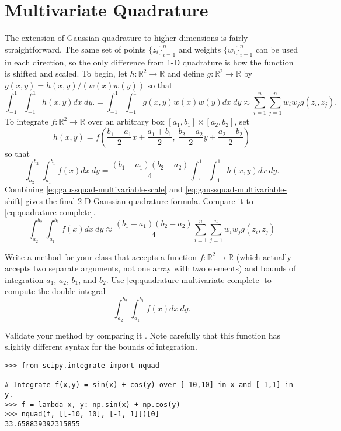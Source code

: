 \section*{Multivariate Quadrature} %

The extension of Gaussian quadrature to higher dimensions is fairly straightforward.
The same set of points $\{z_i\}_{i=1}^n$ and weights $\{w_i\}_{i=1}^n$ can be used in each direction, so the only difference from 1-D quadrature is how the function is shifted and scaled.
To begin, let $h:\mathbb{R}^2\rightarrow\mathbb{R}$ and define $g:\mathbb{R}^2\rightarrow\mathbb{R}$ by $g(x,y) = h(x,y)/(w(x)w(y))$ so that
\begin{equation}
\int_{-1}^1\int_{-1}^1 h(x,y)dx\:dy.
= \int_{-1}^1\int_{-1}^1 g(x,y)w(x)w(y)dx\:dy
\approx \sum_{i=1}^n \sum_{j=1}^n w_i w_j g(z_i,z_j).
\label{eq:gaussquad-multivariable-scale}
\end{equation}
To integrate $f:\mathbb{R}^2\rightarrow\mathbb{R}$ over an arbitrary box $[a_1,b_1]\times[a_2,b_2]$, set
\[
h(x,y) = f\left(\frac{b_1 - a_1}{2}x + \frac{a_1 + b_1}{2},\
                \frac{b_2 - a_2}{2}y + \frac{a_2 + b_2}{2}\right)
\]
so that
\begin{equation}
\int_{a_2}^{b_2}\int_{a_1}^{b_1} f(x) dx\:dy
= \frac{(b_1 - a_1) (b_2 - a_2)}{4}\int_{-1}^1\int_{-1}^1 h(x,y)dx\:dy.
\label{eq:gaussquad-multivariable-shift}
\end{equation}
Combining \eqref{eq:gaussquad-multivariable-scale} and \eqref{eq:gaussquad-multivariable-shift} gives the final 2-D Gaussian quadrature formula.
Compare it to \eqref{eq:quadrature-complete}.
\begin{equation}
\int_{a_2}^{b_2}\int_{a_1}^{b_1} f(x) dx\:dy
\approx \frac{(b_1 - a_1) (b_2 - a_2)}{4}
\sum_{i=1}^n \sum_{j=1}^n w_i w_j g(z_i,z_j)
\label{eq:quadrature-multivariate-complete}
\end{equation}

\begin{problem}
Write a method for your class that accepts a function $f:\mathbb{R}^2\rightarrow\mathbb{R}$ (which actually accepts two separate arguments, not one array with two elements) and bounds of integration $a_1$, $a_2$, $b_1$, and $b_2$.
Use \eqref{eq:quadrature-multivariate-complete} to compute the double integral
\[\int_{a_2}^{b_2}\int_{a_1}^{b_1} f(x) dx\:dy.\]

Validate your method by comparing it .
Note carefully that this function has slightly different syntax for the bounds of integration.
\begin{lstlisting}
>>> from scipy.integrate import nquad

# Integrate f(x,y) = sin(x) + cos(y) over [-10,10] in x and [-1,1] in y.
>>> f = lambda x, y: np.sin(x) + np.cos(y)
>>> nquad(f, [[-10, 10], [-1, 1]])[0]
33.658839392315855
\end{lstlisting}
\end{problem}

